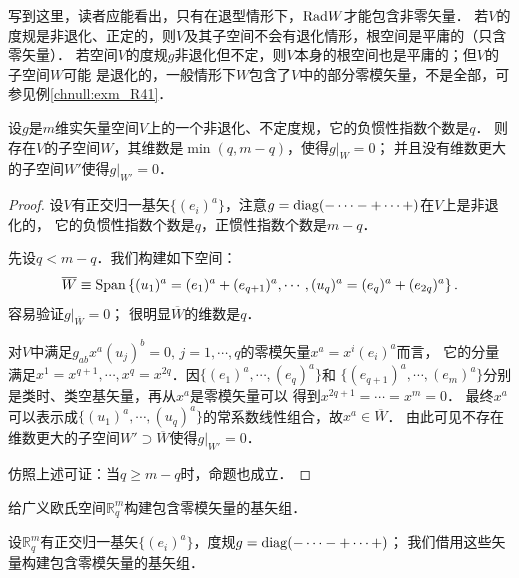 写到这里，读者应能看出，只有在退型情形下，${\rm Rad}W$才能包含非零矢量．
若$V$的度规是非退化、正定的，则$V$及其子空间不会有退化情形，根空间是平庸的（只含零矢量）．
若空间$V$的度规$g$非退化但不定，则$V$本身的根空间也是平庸的；但$V$的子空间$W$可能
是退化的，一般情形下$W$包含了$V$中的部分零模矢量，不是全部，可参见例\ref{chnull:exm_R41}．


\begin{proposition}\label{chnull:thm_maxnull}
    设$g$是$m$维实矢量空间$V$上的一个非退化、不定度规，它的负惯性指数个数是$q$．
    则存在$V$的子空间$W$，其维数是$\min(q, m - q)$，使得$g|_W=0$；
    并且没有维数更大的子空间$W'$使得$g|_{W'}=0$．
\end{proposition}
\begin{proof}
    设$V$有正交归一基矢$\{(e_i)^a\}$，注意$g={\rm diag}(-\cdots -+\cdots +)$在$V$上是非退化的，
    它的负惯性指数个数是$q$，正惯性指数个数是$m-q$．
    
    先设$q<m-q$．我们构建如下空间：
    \begin{equation}
        \overline{W}\equiv {\rm Span}\left\{(u_1)^a= (e_1)^a+(e_{q+1})^a,
        \cdots,(u_q)^a= (e_q)^a+(e_{2q})^a\right\} .
    \end{equation}
    容易验证$g|_{\overline{W}}=0$；
    很明显$\overline{W}$的维数是$q$．
    
    对$V$中满足$g_{ab}x^a (u_j)^b=0,\, j=1,\cdots,q$的零模矢量$x^a=x^i(e_i)^a$而言，
    它的分量满足$x^1=x^{q+1},\cdots,x^q=x^{2q}$．因$\{(e_1)^a,\cdots,(e_q)^a\}$和
    $\{(e_{q+1})^a,\cdots,(e_m)^a\}$分别是类时、类空基矢量，再从$x^a$是零模矢量可以
    得到$x^{2q+1}=\cdots=x^m=0$．
    最终$x^a$可以表示成$\{(u_1)^a,\cdots,(u_q)^a\}$的常系数线性组合，故$x^a\in \overline{W}$．
    由此可见不存在维数更大的子空间$W'\supset \overline{W}$使得$g|_{W'}=0$．
    
    仿照上述可证：当$q\geqslant m-q$时，命题也成立．
\end{proof}
    
\begin{example}\label{chnull:exm_Em-bases}
给广义欧氏空间$\mathbb{R}^m_q$构建包含零模矢量的基矢组．
\end{example}

设$\mathbb{R}^m_q$有正交归一基矢$\{(e_i)^a\}$，度规$g={\rm diag}(-\cdots -+\cdots +)$；
我们借用这些矢量构建包含零模矢量的基矢组．

